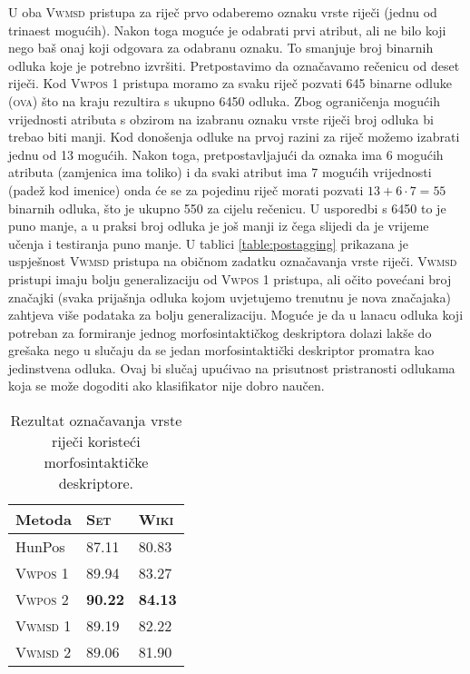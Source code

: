U oba \textsc{Vwmsd} pristupa za riječ prvo odaberemo oznaku vrste riječi (jednu
od trinaest mogućih). Nakon toga moguće je odabrati prvi atribut, ali ne bilo
koji nego baš onaj koji odgovara za odabranu oznaku. To smanjuje broj binarnih
odluka koje je potrebno izvršiti. Pretpostavimo da označavamo rečenicu od deset
riječi. Kod \textsc{Vwpos 1} pristupa moramo za svaku riječ pozvati 645 binarne
odluke (\textsc{ova}) što na kraju rezultira s ukupno 6450 odluka. Zbog
ograničenja mogućih vrijednosti atributa s obzirom na izabranu oznaku vrste
riječi broj odluka bi trebao biti manji. Kod donošenja odluke na prvoj razini za
riječ možemo izabrati jednu od 13 mogućih. Nakon toga, pretpostavljajući da
oznaka ima 6 mogućih atributa (zamjenica ima toliko) i da svaki atribut ima 7
mogućih vrijednosti (padež kod imenice) onda će se za pojedinu riječ morati
pozvati $13+6 \cdot 7 = 55$ binarnih odluka, što je ukupno 550 za cijelu
rečenicu. U usporedbi s 6450 to je puno manje, a u praksi broj odluka je još
manji iz čega slijedi da je vrijeme učenja i testiranja puno manje. U tablici
\ref{table:postagging} prikazana je uspješnost \textsc{Vwmsd} pristupa na
običnom zadatku označavanja vrste riječi. \textsc{Vwmsd} pristupi imaju bolju
generalizaciju od \textsc{Vwpos 1} pristupa, ali očito povećani broj značajki
(svaka prijašnja odluka kojom uvjetujemo trenutnu je nova značajaka) zahtjeva
više podataka za bolju generalizaciju. Moguće je da u lanacu odluka koji
potreban za formiranje jednog morfosintaktičkog deskriptora dolazi lakše do
grešaka nego u slučaju da se jedan morfosintaktički deskriptor promatra kao
jedinstvena odluka. Ovaj bi slučaj upućivao na prisutnost pristranosti odlukama
koja se može dogoditi ako klasifikator nije dobro naučen.

\begin{table}[]
\centering
\caption{Rezultat označavanja vrste riječi koristeći morfosintaktičke
deskriptore.}
\label{table:msdtagging}
\begin{tabular}{|l|l|l|}
\hline
Metoda             & \textsc{Set}   & \textsc{Wiki}  \\ \hline \hline
HunPos             & 87.11          & 80.83          \\
\textsc{Vwpos 1}   & 89.94          & 83.27          \\
\textsc{Vwpos 2}   & \textbf{90.22} & \textbf{84.13} \\
\textsc{Vwmsd 1}   & 89.19          & 82.22          \\
\textsc{Vwmsd 2}   & 89.06          & 81.90          \\ \hline
\end{tabular}
\end{table}
